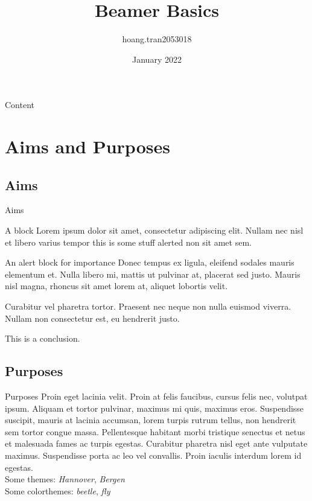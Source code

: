 \documentclass{beamer}
\title{Beamer Basics}
\author{hoang.tran2053018}
\date{January 2022}
\institute{Ho Chi Minh City University of Technology}
\begin{document}
\maketitle

\begin{frame}{Content}
    \tableofcontents
\end{frame}

\section{Aims and Purposes}

\subsection{Aims}
\begin{frame}{Aims}
\begin{block}{A block}
    Lorem ipsum dolor sit amet, consectetur adipiscing elit. Nullam nec nisl et libero varius tempor \alert{this is some stuff alerted} non sit amet sem.
\end{block} \pause
\begin{alertblock}{An alert block for importance}
    Donec tempus ex ligula, eleifend sodales mauris elementum et. Nulla libero mi, mattis ut pulvinar at, placerat sed justo. Mauris nisl magna, rhoncus sit amet lorem at, aliquet lobortis velit.
\end{alertblock} \pause
\begin{example}
    Curabitur vel pharetra tortor. Praesent nec neque non nulla euismod viverra. Nullam non consectetur est, eu hendrerit justo. 
\end{example} \pause
\Huge This is a conclusion.
\end{frame}

\subsection{Purposes}
\begin{frame}{Purposes}
    Proin eget lacinia velit. Proin at felis faucibus, cursus felis nec, volutpat ipsum. Aliquam et tortor pulvinar, maximus mi quis, maximus eros. Suspendisse suscipit, mauris at lacinia accumsan, lorem turpis rutrum tellus, non hendrerit sem tortor congue massa. Pellentesque habitant morbi tristique senectus et netus et malesuada fames ac turpis egestas. Curabitur pharetra nisl eget ante vulputate maximus. Suspendisse porta ac leo vel convallis. Proin iaculis interdum lorem id egestas. \\
    Some themes: \textit{Hannover}, \textit{Bergen} \\ 
    Some colorthemes: \textit{beetle}, \textit{fly}
\end{frame}
\end{document}
